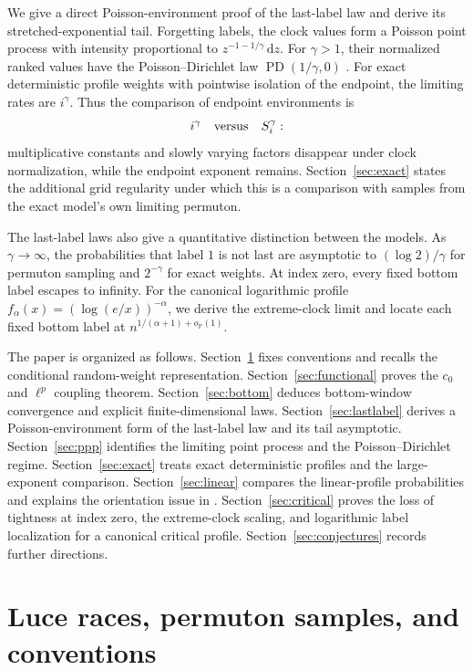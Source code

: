 \documentclass[11pt]{article}
\numberwithin{equation}{section}
\theoremstyle{definition}
\theoremstyle{remark}
\newcommand{\Pp}{\mathbb P}
\newcommand{\PD}{\operatorname{PD}}
\newcommand{\dd}{\,\mathrm d}
\begin{document}
We give a direct Poisson-environment proof of the last-label law and derive its stretched-exponential tail.  Forgetting labels, the clock values form a Poisson point process with intensity proportional to $z^{-1-1/\gamma}\dd z$.  For $\gamma>1$, their normalized ranked values have the Poisson--Dirichlet law $\PD(1/\gamma,0)$ \cite{PitmanYor}.  For exact deterministic profile weights with pointwise isolation of the endpoint, the limiting rates are $i^\gamma$.  Thus the comparison of endpoint environments is
\[
  i^\gamma \quad\hbox{versus}\quad S_i^\gamma:
\]
multiplicative constants and slowly varying factors disappear under clock normalization, while the endpoint exponent remains.  Section~\ref{sec:exact} states the additional grid regularity under which this is a comparison with samples from the exact model's own limiting permuton.

The last-label laws also give a quantitative distinction between the models.  As $\gamma\to\infty$, the probabilities that label $1$ is not last are asymptotic to $(\log2)/\gamma$ for permuton sampling and $2^{-\gamma}$ for exact weights.  At index zero, every fixed bottom label escapes to infinity.  For the canonical logarithmic profile $f_\alpha(x)=(\log(e/x))^{-\alpha}$, we derive the extreme-clock limit and locate each fixed bottom label at $n^{1/(\alpha+1)+o_{\Pp}(1)}$.

The paper is organized as follows.  Section~\ref{sec:setup} fixes conventions and recalls the conditional random-weight representation.  Section~\ref{sec:functional} proves the $c_0$ and $\ell^p$ coupling theorem.  Section~\ref{sec:bottom} deduces bottom-window convergence and explicit finite-dimensional laws.  Section~\ref{sec:lastlabel} derives a Poisson-environment form of the last-label law and its tail asymptotic.  Section~\ref{sec:ppp} identifies the limiting point process and the Poisson--Dirichlet regime.  Section~\ref{sec:exact} treats exact deterministic profiles and the large-exponent comparison.  Section~\ref{sec:linear} compares the linear-profile probabilities and explains the orientation issue in \cite[Section~2.4]{BCD}.  Section~\ref{sec:critical} proves the loss of tightness at index zero, the extreme-clock scaling, and logarithmic label localization for a canonical critical profile.  Section~\ref{sec:conjectures} records further directions.

\section{Luce races, permuton samples, and conventions}
\label{sec:setup}
\end{document}
